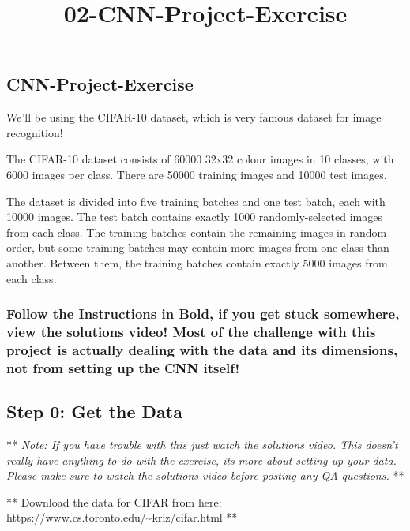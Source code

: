 \documentclass[11pt]{article}
\title{02-CNN-Project-Exercise}
\begin{document}
    
    
    \maketitle
    
    

    
    \subsection{CNN-Project-Exercise}\label{cnn-project-exercise}

We'll be using the CIFAR-10 dataset, which is very famous dataset for
image recognition!

The CIFAR-10 dataset consists of 60000 32x32 colour images in 10
classes, with 6000 images per class. There are 50000 training images and
10000 test images.

The dataset is divided into five training batches and one test batch,
each with 10000 images. The test batch contains exactly 1000
randomly-selected images from each class. The training batches contain
the remaining images in random order, but some training batches may
contain more images from one class than another. Between them, the
training batches contain exactly 5000 images from each class.

\subsubsection{Follow the Instructions in Bold, if you get stuck
somewhere, view the solutions video! Most of the challenge with this
project is actually dealing with the data and its dimensions, not from
setting up the CNN
itself!}\label{follow-the-instructions-in-bold-if-you-get-stuck-somewhere-view-the-solutions-video-most-of-the-challenge-with-this-project-is-actually-dealing-with-the-data-and-its-dimensions-not-from-setting-up-the-cnn-itself}

    \subsection{Step 0: Get the Data}\label{step-0-get-the-data}

** \emph{Note: If you have trouble with this just watch the solutions
video. This doesn't really have anything to do with the exercise, its
more about setting up your data. Please make sure to watch the solutions
video before posting any QA questions.} **

    ** Download the data for CIFAR from here:
https://www.cs.toronto.edu/\textasciitilde{}kriz/cifar.html **
\end{document}
